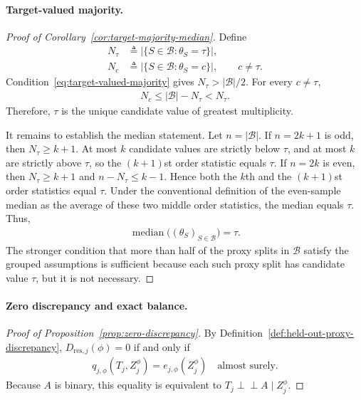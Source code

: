 \paragraph{Target-valued majority.}
\begin{proof}[Proof of Corollary~\ref{cor:target-majority-median}]
Define
\begin{align*}
N_\tau
&\triangleq
\bigl|\{S\in\mathcal B:\theta_S=\tau\}\bigr|,\\
N_c
&\triangleq
\bigl|\{S\in\mathcal B:\theta_S=c\}\bigr|,
\qquad c\ne\tau.
\end{align*}
Condition~\eqref{eq:target-valued-majority} gives $N_\tau>|\mathcal B|/2$. For every $c\ne\tau$,
\begin{align*}
N_c
\le
|\mathcal B|-N_\tau
<
N_\tau.
\end{align*}
Therefore, $\tau$ is the unique candidate value of greatest multiplicity.

It remains to establish the median statement. Let $n=|\mathcal B|$. If $n=2k+1$ is odd, then $N_\tau\ge k+1$. At most $k$ candidate values are strictly below $\tau$, and at most $k$ are strictly above $\tau$, so the $(k+1)$st order statistic equals $\tau$. If $n=2k$ is even, then $N_\tau\ge k+1$ and $n-N_\tau\le k-1$. Hence both the $k$th and the $(k+1)$st order statistics equal $\tau$. Under the conventional definition of the even-sample median as the average of these two middle order statistics, the median equals $\tau$. Thus,
\begin{align*}
\operatorname{median}\bigl((\theta_S)_{S\in\mathcal B}\bigr)=\tau.
\end{align*}
The stronger condition that more than half of the proxy splits in $\mathcal B$ satisfy the grouped assumptions is sufficient because each such proxy split has candidate value $\tau$, but it is not necessary.
\end{proof}

\paragraph{Zero discrepancy and exact balance.}
\begin{proof}[Proof of Proposition~\ref{prop:zero-discrepancy}]
By Definition~\ref{def:held-out-proxy-discrepancy}, $D_{\mathrm{res},j}(\phi)=0$ if and only if
\begin{align}
q_{j,\phi}(T_j,Z_j^\phi)=e_{j,\phi}(Z_j^\phi)
\quad\text{almost surely}.
\end{align}
Because $A$ is binary, this equality is equivalent to $T_j\perp\!\!\!\perp A\mid Z_j^\phi$.
\end{proof}

